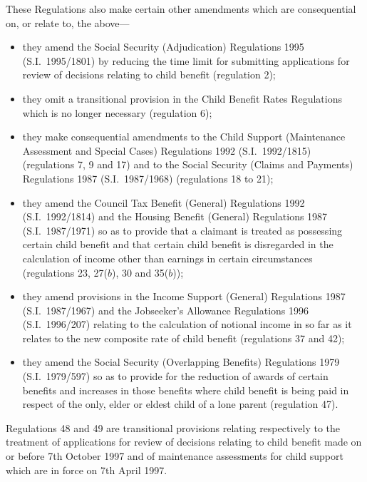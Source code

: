 \documentclass[a4paper]{article}
\begin{document}
  These Regulations also make certain other amendments which are consequential on, or relate to, the above—
\begin{itemize}
\item they amend the Social Security (Adjudication) Regulations 1995 (S.I.\ 1995/1801) by reducing the time limit for submitting applications for review of decisions relating to child benefit (regulation 2);

\item they omit a transitional provision in the Child Benefit Rates Regulations which is no longer necessary (regulation 6);

\item they make consequential amendments to the Child Support (Maintenance Assessment and Special Cases) Regulations 1992 (S.I.\ 1992/1815) (regulations 7, 9 and 17) and to the Social Security (Claims and Payments) Regulations 1987 (S.I.\ 1987/1968) (regulations 18 to 21);

\item they amend the Council Tax Benefit (General) Regulations 1992 (S.I.\ 1992/1814) and the Housing Benefit (General) Regulations 1987 (S.I.\ 1987/1971) so as to provide that a claimant is treated as possessing certain child benefit and that certain child benefit is disregarded in the calculation of income other than earnings in certain circumstances (regulations 23, 27($b$), 30 and 35($b$));

\item they amend provisions in the Income Support (General) Regulations 1987 (S.I.\ 1987/1967) and the Jobseeker’s Allowance Regulations 1996 (S.I.\ 1996/207) relating to the calculation of notional income in so far as it relates to the new composite rate of child benefit (regulations 37 and 42);

\item they amend the Social Security (Overlapping Benefits) Regulations 1979 (S.I.\ 1979/597) so as to provide for the reduction of awards of certain benefits and increases in those benefits where child benefit is being paid in respect of the only, elder or eldest child of a lone parent (regulation 47).
\end{itemize}

  Regulations 48 and 49 are transitional provisions relating respectively to the treatment of applications for review of decisions relating to child benefit made on or before 7th October 1997 and of maintenance assessments for child support which are in force on 7th April 1997.
\end{document}
